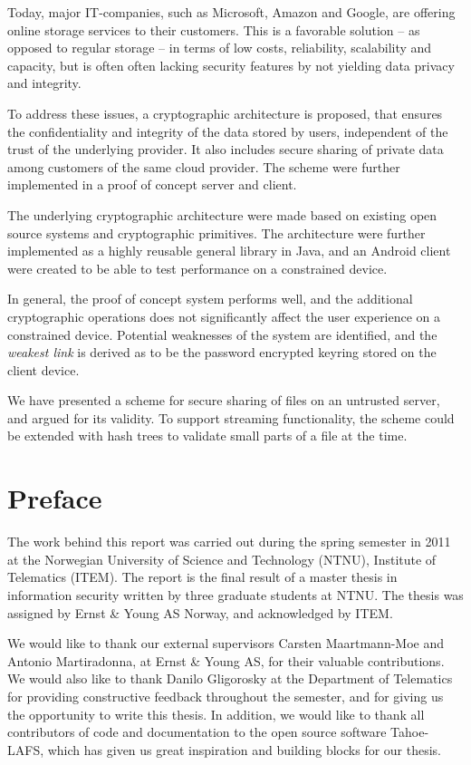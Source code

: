 \documentclass[pdftex,english,10pt,b5paper,twoside]{book}
\begin{document}
Today, major IT-companies, such as Microsoft, Amazon and Google, are offering
online storage services to their customers. This is a favorable solution -- as
opposed to regular storage -- in terms of low costs, reliability,
scalability and capacity, but is often often lacking security features by not
yielding data privacy and integrity.

To address these issues, a cryptographic architecture is proposed, that ensures
the confidentiality and integrity of the data stored by users, independent of
the trust of the underlying provider. It also includes secure sharing of
private data among customers of the same cloud provider. The scheme were
further implemented in a proof of concept server and client.

The underlying cryptographic architecture were made based on existing open
source systems and cryptographic primitives. The architecture were further
implemented as a highly reusable general library in Java, and an Android client
were created to be able to test performance on a constrained device.

In general, the proof of concept system performs well, and the additional
cryptographic operations does not significantly affect the user experience on a
constrained device. Potential weaknesses of the system are identified, and the
\emph{weakest link} is derived as to be the password encrypted keyring stored
on the client device.

We have presented a scheme for secure sharing of files on an untrusted server,
and argued for its validity. To support streaming functionality, the scheme
could be extended with hash trees to validate small parts of a file at the
time.

\chapter*{Preface}

The work behind this report was carried out during the spring semester in 2011
at the Norwegian University of Science and Technology (NTNU), Institute of
Telematics (ITEM). The report is the final result of a master thesis in
information security written by three graduate students at NTNU. The thesis was
assigned by Ernst \& Young AS Norway, and acknowledged by ITEM.

\vspace{13pt}

We would like to thank our external supervisors Carsten Maartmann-Moe and
Antonio Martiradonna, at Ernst \& Young AS, for their valuable contributions.
We would also like to thank Danilo Gligorosky at the Department of Telematics
for providing constructive feedback throughout the semester, and for giving us
the opportunity to write this thesis. In addition, we would like to thank all
contributors of code and documentation to the open source software Tahoe-LAFS,
which has given us great inspiration and building blocks for our thesis.
\end{document}
